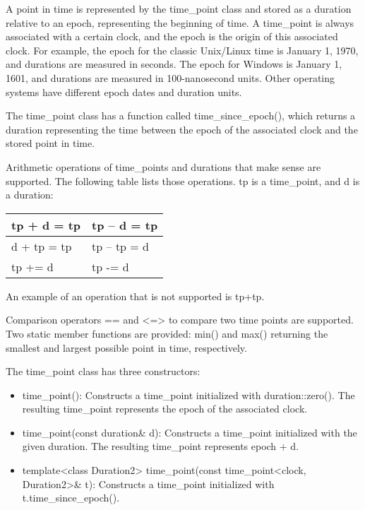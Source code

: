 A point in time is represented by the time\_point class and stored as a duration relative to an epoch, representing the beginning of time. A time\_point is always associated with a certain clock, and the epoch is the origin of this associated clock. For example, the epoch for the classic Unix/Linux time is January 1, 1970, and durations are measured in seconds. The epoch for Windows is January 1, 1601, and durations are measured in 100-nanosecond units. Other operating systems have different epoch dates and duration units.

The time\_point class has a function called time\_since\_epoch(), which returns a duration representing the time between the epoch of the associated clock and the stored point in time.

Arithmetic operations of time\_points and durations that make sense are supported. The following table lists those operations. tp is a time\_point, and d is a duration:

\begin{longtable}{|l|l|}
\hline
tp + d = tp & tp – d = tp \\ \hline
\endfirsthead
%
\endhead
%
d + tp = tp & tp – tp = d \\ \hline
tp += d     & tp -= d     \\ \hline
\end{longtable}

An example of an operation that is not supported is tp+tp.

Comparison operators == and <=> to compare two time points are supported. Two static member functions are provided: min() and max() returning the smallest and largest possible point in time, respectively.

The time\_point class has three constructors:

\begin{itemize}
\item
time\_point(): Constructs a time\_point initialized with duration::zero(). The resulting time\_point represents the epoch of the associated clock.

\item
time\_point(const duration\& d): Constructs a time\_point initialized with the given duration. The resulting time\_point represents epoch + d.

\item
template<class Duration2> time\_point(const time\_point<clock, Duration2>\& t): Constructs a time\_point initialized with t.time\_since\_epoch().
\end{itemize}

